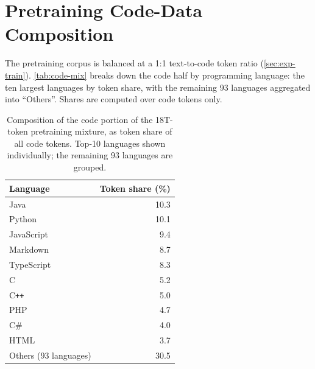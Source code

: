 \documentclass{llmxive}
\begin{document}


\section{Pretraining Code-Data Composition}
\label{app:code-mix}

The pretraining corpus is balanced at a 1:1 text-to-code token ratio
(\autoref{sec:exp-train}). \autoref{tab:code-mix} breaks down the code half by
programming language: the ten largest languages by token share, with the
remaining 93 languages aggregated into ``Others''. Shares are computed over
code tokens only.

\begin{table}[!htbp]
\centering
\begin{tabular}{lr}
\toprule
\textbf{Language} & \textbf{Token share (\%)} \\
\midrule
Java                & 10.3 \\
Python              & 10.1 \\
JavaScript          & 9.4 \\
Markdown            & 8.7 \\
TypeScript          & 8.3 \\
C                   & 5.2 \\
C\texttt{++}        & 5.0 \\
PHP                 & 4.7 \\
C\#                 & 4.0 \\
HTML                & 3.7 \\
\midrule
Others (93 languages) & 30.5 \\
\bottomrule
\end{tabular}
\caption{Composition of the code portion of the 18T-token pretraining mixture,
as token share of all code tokens. Top-10 languages shown individually; the
remaining 93 languages are grouped.}
\label{tab:code-mix}
\end{table}
\end{document}
